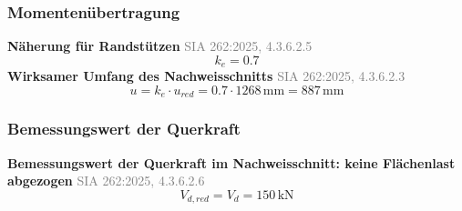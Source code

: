 \documentclass[11pt,a4paper]{article}
\newcommand{\normref}[1]{{\small\textcolor{gray}{#1}}}
\begin{document}
\subsubsection{Momentenübertragung}
\noindent\textbf{Näherung für Randstützen} \hfill \normref{SIA 262:2025, 4.3.6.2.5}
\begin{equation*}
k_e = 0.7
\end{equation*}
\noindent\textbf{Wirksamer Umfang des Nachweisschnitts} \hfill \normref{SIA 262:2025, 4.3.6.2.3}
\begin{equation*}
u = k_e \cdot u_{red} = 0.7 \cdot 1268\,\mathrm{mm} = 887\,\mathrm{mm}
\end{equation*}
\subsubsection{Bemessungswert der Querkraft}
\noindent\textbf{Bemessungswert der Querkraft im Nachweisschnitt: keine Flächenlast abgezogen} \hfill \normref{SIA 262:2025, 4.3.6.2.6}
\begin{equation*}
V_{d,red} = V_d = 150\,\mathrm{kN}
\end{equation*}
\end{document}
